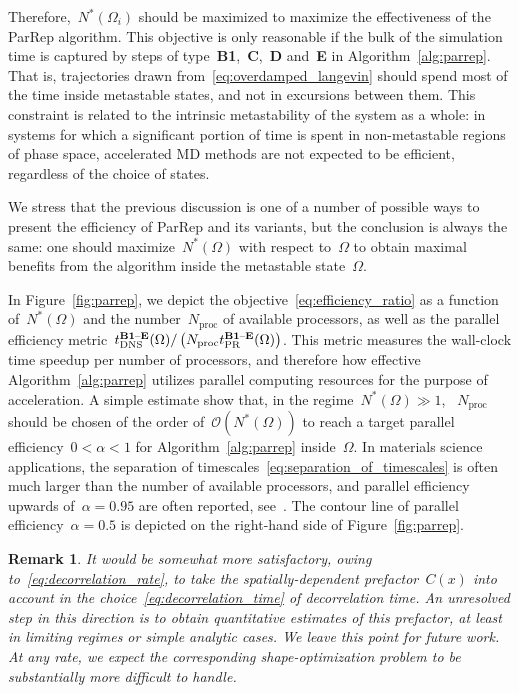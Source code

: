 \documentclass[a4]{article}
\newcommand{\1}{\mathbbm 1}
\newcommand{\bigo}{\mathcal{O}}
\newtheorem{remark}{Remark}
\begin{document}
    Therefore,~$N^*(\Omega_i)$ should be maximized to maximize the effectiveness of the ParRep algorithm. This objective is only reasonable if the bulk of the simulation time is captured by steps of type~{\bf B1},~{\bf C},~{\bf D} and~{\bf E} in Algorithm~\ref{alg:parrep}.
    That is, trajectories drawn from~\eqref{eq:overdamped_langevin} should spend most of the time inside metastable states, and not in excursions between them. This constraint is related to the intrinsic metastability of the system as a whole: in systems for which a significant portion of time is spent in non-metastable regions of phase space, accelerated MD methods are not expected to be efficient, regardless of the choice of states.

    We stress that the previous discussion is one of a number of possible ways to present the efficiency of ParRep and its variants, but the conclusion is always the same: one should maximize~$N^*(\Omega)$ with respect to~$\Omega$ to obtain maximal benefits from the algorithm inside the metastable state~$\Omega$.
    
    In Figure~\ref{fig:parrep}, we depict the objective~\eqref{eq:efficiency_ratio} as a function of~$N^*(\Omega)$ and the number~$N_{\mathrm{proc}}$ of available processors, as well as the parallel efficiency metric~$t_{\mathrm{DNS}}^{\text{{\bf B1}--{\bf E}}}(\Omega)/\left(N_{\mathrm{proc}}t_{\mathrm{PR}}^{\text{{\bf B1}--{\bf E}}}(\Omega)\right)$.
    This metric measures the wall-clock time speedup per number of processors, and therefore how effective Algorithm~\ref{alg:parrep} utilizes parallel computing resources for the purpose of acceleration. A simple estimate show that, in the regime~$N^*(\Omega)\gg 1$, ~$N_{\mathrm{proc}}$ should be chosen of the order of~$\bigo\left(N^*(\Omega)\right)$ to reach a target parallel efficiency~$0<\alpha<1$ for Algorithm~\ref{alg:parrep} inside~$\Omega$.
    In materials science applications, the separation of timescales~\eqref{eq:separation_of_timescales} is often much larger than the number of available processors, and parallel efficiency upwards of~$\alpha=0.95$ are often reported, see~\cite{PUV15}. The contour line of parallel efficiency~$\alpha=0.5$ is depicted on the right-hand side of Figure~\ref{fig:parrep}.

    \begin{remark}
        It would be somewhat more satisfactory, owing to~\eqref{eq:decorrelation_rate}, to take the spatially-dependent prefactor~$C(x)$ into account in the choice~\eqref{eq:decorrelation_time} of decorrelation time. An unresolved step in this direction is to obtain quantitative estimates of this prefactor, at least in limiting regimes or simple analytic cases. We leave this point for future work.
        At any rate, we expect the corresponding shape-optimization problem to be substantially more difficult to handle.
    \end{remark}
\end{document}
